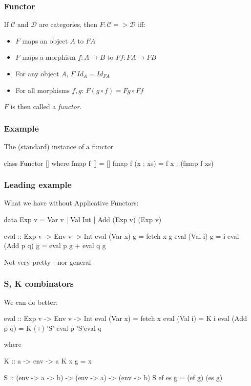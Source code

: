 \documentclass[18pt]{beamer}
\begin{document}
\begin{frame}[fragile] \frametitle{Functor}
  If $\mathcal{C}$ and $\mathcal{D}$ are categories, then $F \colon
  \mathcal{C} => \mathcal{D}$ iff:
  \begin{itemize}
  \item $F$ maps an object $A$ to $F A$
  \item $F$ maps a morphism $f \colon A \to B$ to $F f \colon F A \to
    F B$
  \item For any object $A$, $F \; Id_A = Id_{F A}$
  \item For all morphisms $f, g$: \quad $F (g \circ f) = F g \circ F f$
  \end{itemize}
  $F$ is then called a \emph{functor}.
\end{frame}

\begin{frame}[fragile] \frametitle{Example}
  The (standard) instance of a functor\\
  \begin{code}
    class Functor [] where
      fmap f [] = []
      fmap f (x : xs) = f x : (fmap f xs)
  \end{code}
\end{frame}

\begin{frame}[fragile] \frametitle{Leading example}
What we have without Applicative Functors:\\

\begin{code}
data Exp v = Var v
           | Val Int
           | Add (Exp v) (Exp v)

eval :: Exp v -> Env v -> Int
eval (Var x) g = fetch x g
eval (Val i) g = i
eval (Add p q) g = eval p g + eval q g
\end{code}
Not very pretty - nor general
\end{frame}

\begin{frame}[fragile] \frametitle{S, K combinators}
We can do better:\\
\begin{code}
eval :: Exp v -> Env v -> Int
eval (Var x) = fetch x
eval (Val i) = K i
eval (Add p q) = K (+) 'S' eval p 'S'eval q
\end{code}
where\\
\begin{code}
K :: a -> env -> a
K x g = x

S :: (env -> a -> b)
         -> (env -> a) -> (env -> b)
S ef es g = (ef g) (es g)
\end{code}
\end{frame}
\end{document}
